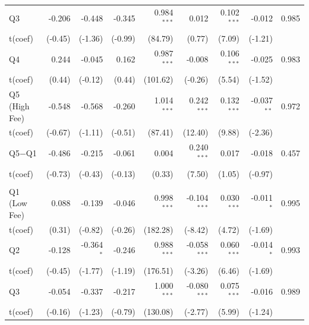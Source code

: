 {\begin{longtable}[t]{lrrrrrrrr}
\hspace{1em}Q3 & -0.206 & -0.448 & -0.345 & 0.984$^{***}$ & 0.012 & 0.102$^{***}$ & -0.012 & 0.985\\
\hspace{1em}t(coef) & (-0.45) & (-1.36) & (-0.99) & (84.79) & (0.77) & (7.09) & (-1.21) & \\
\hspace{1em}Q4 & 0.244 & -0.045 & 0.162 & 0.987$^{***}$ & -0.008 & 0.106$^{***}$ & -0.025 & 0.983\\
\hspace{1em}t(coef) & (0.44) & (-0.12) & (0.44) & (101.62) & (-0.26) & (5.54) & (-1.52) & \\
\hspace{1em}Q5 (High Fee) & -0.548 & -0.568 & -0.260 & 1.014$^{***}$ & 0.242$^{***}$ & 0.132$^{***}$ & -0.037$^{**}$ & 0.972\\
\hspace{1em}t(coef) & (-0.67) & (-1.11) & (-0.51) & (87.41) & (12.40) & (9.88) & (-2.36) & \\
\hspace{1em}Q5$-$Q1 & -0.486 & -0.215 & -0.061 & 0.004 & 0.240$^{***}$ & 0.017 & -0.018 & 0.457\\
\hspace{1em}t(coef) & (-0.73) & (-0.43) & (-0.13) & (0.33) & (7.50) & (1.05) & (-0.97) & \\
\addlinespace[0.3em]
\hline
\multicolumn{9}{l}{Passive --- VW}\\
\hspace{1em}Q1 (Low Fee) & 0.088 & -0.139 & -0.046 & 0.998$^{***}$ & -0.104$^{***}$ & 0.030$^{***}$ & -0.011$^{*}$ & 0.995\\
\hspace{1em}t(coef) & (0.31) & (-0.82) & (-0.26) & (182.28) & (-8.42) & (4.72) & (-1.69) & \\
\hspace{1em}Q2 & -0.128 & -0.364$^{*}$ & -0.246 & 0.988$^{***}$ & -0.058$^{***}$ & 0.060$^{***}$ & -0.014$^{*}$ & 0.993\\
\hspace{1em}t(coef) & (-0.45) & (-1.77) & (-1.19) & (176.51) & (-3.26) & (6.46) & (-1.69) & \\
\hspace{1em}Q3 & -0.054 & -0.337 & -0.217 & 1.000$^{***}$ & -0.080$^{***}$ & 0.075$^{***}$ & -0.016 & 0.989\\
\hspace{1em}t(coef) & (-0.16) & (-1.23) & (-0.79) & (130.08) & (-2.77) & (5.99) & (-1.24) & \\

\end{longtable}}
